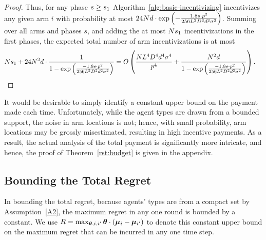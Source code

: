 \begin{proof}
Thus, for any phase $s \geq s_1$
Algorithm~\ref{alg:basic-incentivizing} incentivizes any given arm $i$
with probability at most
$24 N d \cdot \exp \left(
  -\frac{1.8 s \cdot p^2}{256 L^2 D^2 d^2 \sigma^2}
\right)$.
Summing over all arms and phases $s$,
and adding the at most $N s_1$ incentivizations in
the first \EvenLaterPhase phases, 
the expected total number of arm incentivizations is at most
\begin{align*}
N s_1
  + 24 N^2 d \cdot \frac{1}{1 - \exp \left(
    \frac{-1.8 s \cdot p^2}{256 L^2 D^2 d^2 \sigma^2}
  \right)}
& = O\left( \frac{N L^4 D^4 d^4 \sigma^4}{p^4}
  + \frac{N^2 d}{1 - \exp \left(
    \frac{-1.8 s \cdot p^2}{256 L^2 D^2 d^2 \sigma^2}
  \right)} \right).
\end{align*}

\end{proof}

It would be desirable to simply identify a constant upper bound on the
payment made each time.
Unfortunately, while the agent types are drawn from a bounded support,
the noise in arm locations is not;
hence, with small probability, arm locations may be grossly
misestimated, resulting in high incentive payments.
As a result, the actual analysis of the total payment is significantly more
intricate, and hence,
the proof of Theorem~\ref{rst:budget} is given in the appendix.


\subsection{Bounding the Total Regret}
In bounding the total regret, because agents' types are from a compact
set by Assumption~\ref{A2}, the maximum regret in any one round is
bounded by a constant.
We use $R = \max_{\bm{\theta}, i,i'} \bm{\theta} \cdot (\bm{\mu}_{i} - \bm{\mu}_{i'})$
to denote this constant upper bound on the maximum regret that can be
incurred in any one time step. 


